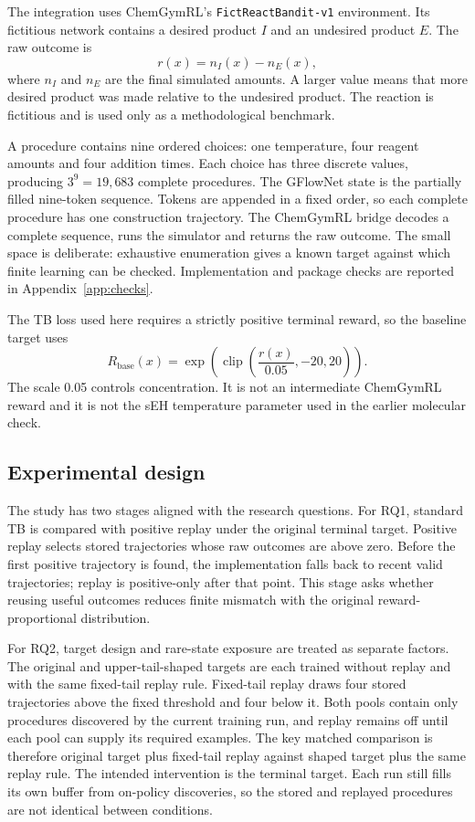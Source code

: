 \documentclass{article}
\begin{document}
The integration uses ChemGymRL's \texttt{FictReactBandit-v1} environment. Its fictitious network contains a desired product $I$ and an undesired product $E$. The raw outcome is
\begin{equation}
r(x)=n_I(x)-n_E(x),
\end{equation}
where $n_I$ and $n_E$ are the final simulated amounts. A larger value means that more desired product was made relative to the undesired product. The reaction is fictitious and is used only as a methodological benchmark.

A procedure contains nine ordered choices: one temperature, four reagent amounts and four addition times. Each choice has three discrete values, producing $3^9=19{,}683$ complete procedures. The GFlowNet state is the partially filled nine-token sequence. Tokens are appended in a fixed order, so each complete procedure has one construction trajectory. The ChemGymRL bridge decodes a complete sequence, runs the simulator and returns the raw outcome. The small space is deliberate: exhaustive enumeration gives a known target against which finite learning can be checked. Implementation and package checks are reported in Appendix~\ref{app:checks}.

The TB loss used here requires a strictly positive terminal reward, so the baseline target uses
\begin{equation}
R_{\mathrm{base}}(x)=
\exp\!\left(\operatorname{clip}\!\left(\frac{r(x)}{0.05},-20,20\right)\right).
\end{equation}
The scale 0.05 controls concentration. It is not an intermediate ChemGymRL reward and it is not the sEH temperature parameter used in the earlier molecular check.

\subsection{Experimental design}

The study has two stages aligned with the research questions. For RQ1, standard TB is compared with positive replay under the original terminal target. Positive replay selects stored trajectories whose raw outcomes are above zero. Before the first positive trajectory is found, the implementation falls back to recent valid trajectories; replay is positive-only after that point. This stage asks whether reusing useful outcomes reduces finite mismatch with the original reward-proportional distribution.

For RQ2, target design and rare-state exposure are treated as separate factors. The original and upper-tail-shaped targets are each trained without replay and with the same fixed-tail replay rule. Fixed-tail replay draws four stored trajectories above the fixed threshold and four below it. Both pools contain only procedures discovered by the current training run, and replay remains off until each pool can supply its required examples. The key matched comparison is therefore original target plus fixed-tail replay against shaped target plus the same replay rule. The intended intervention is the terminal target. Each run still fills its own buffer from on-policy discoveries, so the stored and replayed procedures are not identical between conditions.
\end{document}
